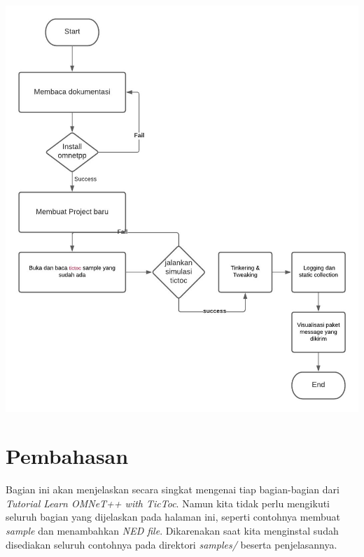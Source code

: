 \documentclass[conference]{IEEEtran}
\begin{document}
\includegraphics[scale=0.18]{images/flowchart.png}
\break

\section{Pembahasan}
Bagian ini akan menjelaskan secara singkat mengenai tiap bagian-bagian dari \textit{Tutorial Learn OMNeT++ with TicToc}. Namun kita tidak perlu mengikuti seluruh bagian yang dijelaskan pada halaman ini, seperti contohnya membuat \textit{sample} dan menambahkan \textit{NED file}. Dikarenakan saat kita menginstal sudah disediakan seluruh contohnya pada direktori \textit{samples/} beserta penjelasannya.
\end{document}
